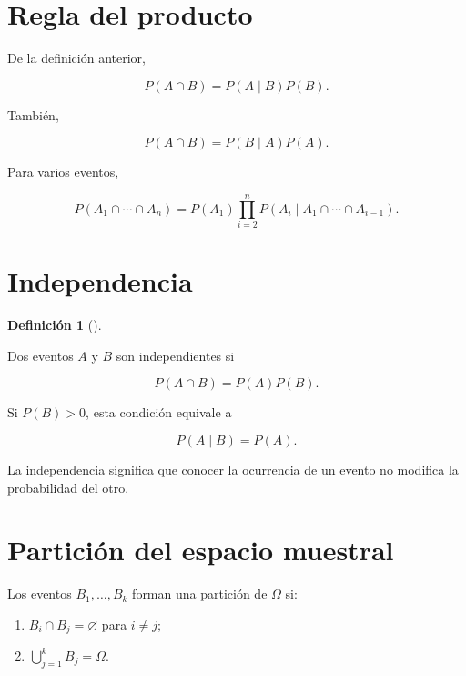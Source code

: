 \documentclass[
  spanish,
  10.5pt,
  letterpaper,
  DIV=11,
  numbers=noendperiod,
  oneside,
  open=any]{scrreprt}
\providecommand{\tightlist}{%
  \setlength{\itemsep}{0pt}\setlength{\parskip}{0pt}}
\theoremstyle{definition}
\newtheorem{definition}{Definición}[chapter]
\theoremstyle{definition}
\theoremstyle{plain}
\theoremstyle{remark}
\begin{document}
\section*{Regla del producto}\label{regla-del-producto}


De la definición anterior,

\[
P(A\cap B)
=
P(A\mid B)P(B).
\]

También,

\[
P(A\cap B)
=
P(B\mid A)P(A).
\]

Para varios eventos,

\[
P(A_1\cap\cdots\cap A_n)
=
P(A_1)
\prod_{i=2}^{n}
P(A_i\mid A_1\cap\cdots\cap A_{i-1}).
\]

\section*{Independencia}\label{independencia}


\begin{definition}[]\protect\hypertarget{def-independencia-eventos}{}\label{def-independencia-eventos}

Dos eventos \(A\) y \(B\) son independientes si

\[
P(A\cap B)
=
P(A)P(B).
\]

\end{definition}

Si \(P(B)>0\), esta condición equivale a

\[
P(A\mid B)=P(A).
\]

La independencia significa que conocer la ocurrencia de un evento no
modifica la probabilidad del otro.

\section*{Partición del espacio
muestral}\label{particiuxf3n-del-espacio-muestral}


Los eventos \(B_1,\ldots,B_k\) forman una partición de \(\Omega\) si:

\begin{enumerate}
\def\labelenumi{\arabic{enumi}.}
\tightlist
\item
  \(B_i\cap B_j=\varnothing\) para \(i\neq j\);
\item
  \(\bigcup_{j=1}^{k}B_j=\Omega\).
\end{enumerate}
\end{document}
